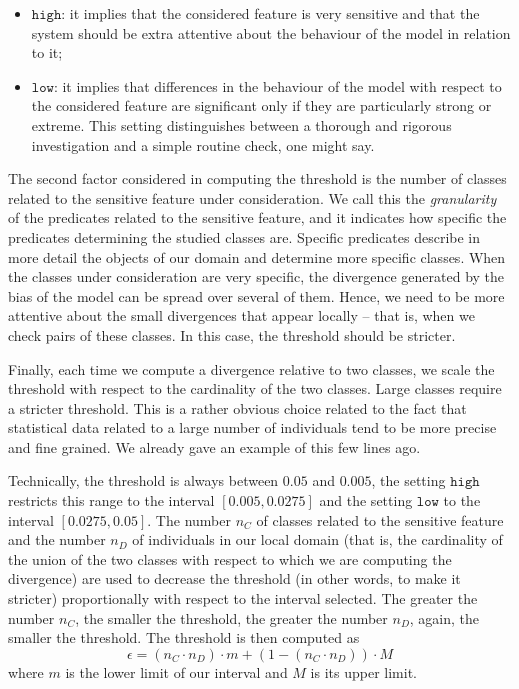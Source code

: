 \documentclass[
]{ceurart}
\begin{document}
\begin{itemize}
\item $\mathtt{high}$: it implies that the considered feature is very sensitive and that the system should be extra attentive about the behaviour of the model in relation to it;
\item $\mathtt{low}$: it implies that differences in the behaviour of the model with respect to the considered feature are significant only if they are particularly strong or extreme. This setting distinguishes between a thorough and rigorous investigation and a simple routine check, one might say.
\end{itemize}



The second factor considered in computing the threshold is the number of classes related to the sensitive feature under consideration. We  call this the {\it granularity} of the predicates related to the sensitive feature, and it indicates how specific the predicates determining the studied classes are. Specific predicates describe in more detail the objects of our domain and determine more specific classes. When the classes under consideration are very specific, the divergence generated by the bias of the model can be spread over several of them. Hence, we need to be more attentive about the small divergences that appear locally -- that is, when we check pairs of these classes. In this case, the threshold should be stricter.

Finally, each time we compute a divergence relative to two classes, we scale the threshold with respect to the cardinality of the two classes. Large classes require a stricter threshold. This is a rather obvious choice related to the fact that statistical data related to a large number of individuals tend to be more precise and fine grained. We already gave an example of this few lines ago.

Technically, the threshold is always between $0.05$ and $0.005$, the setting $\mathtt{high}$ restricts this range to the interval $[0.005,0.0275]$ and the setting $\mathtt{low}$ to the interval $[0.0275,0.05]$. The number $n_C$ of classes related to the sensitive feature and the number $n_D$ of individuals in our local domain (that is, the cardinality of the union of the two classes with respect to which we are computing the divergence) are used to decrease the threshold (in other words, to make it stricter) proportionally with respect to the interval selected. The greater the number $n_C$, the smaller the threshold, the greater the number $n_D$, again, the smaller the threshold. The threshold is then computed as
\[
\epsilon = (n_C \cdot n_D) \cdot m + (1-(n_C \cdot n_D)) \cdot M
\]
where $m$ is the lower limit of our interval and $M$ is its upper limit.
\end{document}
